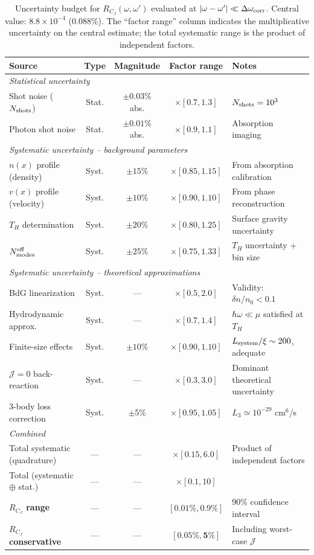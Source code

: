 \documentclass[prd,aps,showpacs,superscriptaddress,twocolumn]{revtex4-2}
\begin{document}
\begin{table}[h]
\centering
\caption{Uncertainty budget for $R_{C_J}(\omega,\omega')$ evaluated at $|\omega-\omega'| \ll \Delta\omega_{\rm corr}$. Central value: $8.8 \times 10^{-4}$ (0.088\%). The ``factor range'' column indicates the multiplicative uncertainty on the central estimate; the total systematic range is the product of independent factors.}
\label{tab:uncertainty_budget}
\begin{tabular}{lcccl}
\toprule
\textbf{Source} & \textbf{Type} & \textbf{Magnitude} & \textbf{Factor range} & \textbf{Notes} \\
\midrule
\multicolumn{5}{l}{\textit{Statistical uncertainty}} \\
\midrule
Shot noise ($N_{\rm shots}$) & Stat. & $\pm 0.03\%$ abs. & $\times [0.7, 1.3]$ & $N_{\rm shots} = 10^3$ \\
Photon shot noise & Stat. & $\pm 0.01\%$ abs. & $\times [0.9, 1.1]$ & Absorption imaging \\
\midrule
\multicolumn{5}{l}{\textit{Systematic uncertainty -- background parameters}} \\
\midrule
$n(x)$ profile (density) & Syst. & $\pm 15\%$ & $\times [0.85, 1.15]$ & From absorption calibration \\
$v(x)$ profile (velocity) & Syst. & $\pm 10\%$ & $\times [0.90, 1.10]$ & From phase reconstruction \\
$T_H$ determination & Syst. & $\pm 20\%$ & $\times [0.80, 1.25]$ & Surface gravity uncertainty \\
$N_{\rm modes}^{\rm eff}$ & Syst. & $\pm 25\%$ & $\times [0.75, 1.33]$ & $T_H$ uncertainty + bin size \\
\midrule
\multicolumn{5}{l}{\textit{Systematic uncertainty -- theoretical approximations}} \\
\midrule
BdG linearization & Syst. & — & $\times [0.5, 2.0]$ & Validity: $\delta n/n_0 < 0.1$ \\
Hydrodynamic approx. & Syst. & — & $\times [0.7, 1.4]$ & $\hbar\omega \ll \mu$ satisfied at $T_H$ \\
Finite-size effects & Syst. & $\pm 10\%$ & $\times [0.90, 1.10]$ & $L_{\rm system}/\xi \sim 200$, adequate \\
$\mathcal{J}=0$ back-reaction & Syst. & — & $\times [0.3, 3.0]$ & Dominant theoretical uncertainty \\
3-body loss correction & Syst. & $\pm 5\%$ & $\times [0.95, 1.05]$ & $L_3 \simeq 10^{-29}$ cm$^6$/s \\
\midrule
\multicolumn{5}{l}{\textit{Combined}} \\
\midrule
Total systematic (quadrature) & — & — & $\times [0.15, 6.0]$ & Product of independent factors \\
Total (systematic $\oplus$ stat.) & — & — & $\times [0.1, 10]$ & \\
\textbf{$R_{C_J}$ range} & — & — & $\mathbf{[0.01\%, 0.9\%]}$ & 90\% confidence interval \\
\textbf{$R_{C_J}$ conservative} & — & — & $\mathbf{[0.05\%, 5\%]}$ & Including worst-case $\mathcal{J}$ \\
\bottomrule
\end{tabular}
\end{table}
\end{document}
